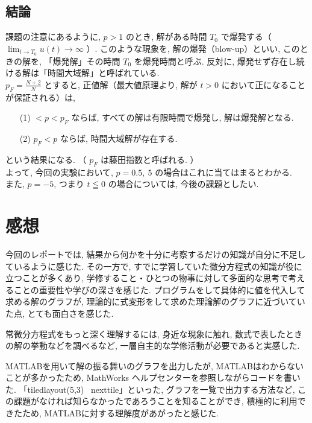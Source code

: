 \documentclass[11pt]{jsarticle}
\begin{document}
\subsection{結論}
課題の注意にあるように, $p > 1$ のとき, 解がある時間 $T_{0}$ で爆発する（$ \lim_{t \to T_{0}}u(t) \rightarrow \infty$ ）. このような現象を, 解の爆発（blow-up）といい, このときの解を, 「爆発解」その時間 $T_{0}$ を爆発時間と呼ぶ. 反対に, 爆発せず存在し続ける解は「時間大域解」と呼ばれている. \\
$p_{F} = \frac{N + 2}{N}$ とすると, 正値解（最大値原理より, 解が $t > 0$ において正になることが保証される）は, 
\begin{itemize}
\item[(1)] $ < p < p_{F}$ ならば, すべての解は有限時間で爆発し, 解は爆発解となる. 
\item[(2)] $p_{F} < p$ ならば, 時間大域解が存在する. 
\end{itemize}
という結果になる. （ $p_{F}$ は藤田指数と呼ばれる. ）\\
よって, 今回の実験において, $p = 0.5,\ 5$ の場合はこれに当てはまるとわかる. \\
また, $p = -5$, つまり $t \leqq 0$ の場合については, 今後の課題としたい. \\
\clearpage
\section{感想}
今回のレポートでは, 結果から何かを十分に考察するだけの知識が自分に不足しているように感じた. その一方で, すでに学習していた微分方程式の知識が役に立つことが多くあり, 学修すること・ひとつの物事に対して多面的な思考で考えることの重要性や学びの深さを感じた. プログラムをして具体的に値を代入して求める解のグラフが, 理論的に式変形をして求めた理論解のグラフに近づいていた点, とても面白さを感じた. \par
常微分方程式をもっと深く理解するには, 身近な現象に触れ, 数式で表したときの解の挙動などを調べるなど, 一層自主的な学修活動が必要であると実感した. \par
MATLABを用いて解の振る舞いのグラフを出力したが, MATLABはわからないことが多かったため, MathWorks ヘルプセンターを参照しながらコードを書いた. 「tiledlayout(5,3) \ nexttile」といった, グラフを一覧で出力する方法など, この課題がなければ知らなかったであろうことを知ることができ, 積極的に利用できたため, MATLABに対する理解度があがったと感じた. \par
\end{document}
